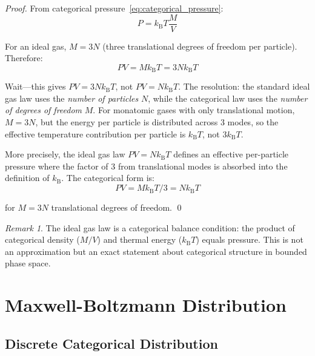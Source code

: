 \documentclass[twocolumn,10pt]{article}
\theoremstyle{definition}
\theoremstyle{remark}
\newtheorem{remark}[theorem]{Remark}
\newcommand{\kB}{k_{\mathrm{B}}}
\begin{document}
\begin{proof}
From categorical pressure~\eqref{eq:categorical_pressure}:
\begin{equation}
P = \kB T \frac{M}{V}
\end{equation}

For an ideal gas, $M = 3N$ (three translational degrees of freedom per particle). Therefore:
\begin{equation}
PV = M\kB T = 3N\kB T
\end{equation}

Wait---this gives $PV = 3N\kB T$, not $PV = N\kB T$. The resolution: the standard ideal gas law uses the \textit{number of particles} $N$, while the categorical law uses the \textit{number of degrees of freedom} $M$. For monatomic gases with only translational motion, $M = 3N$, but the energy per particle is distributed across 3 modes, so the effective temperature contribution per particle is $\kB T$, not $3\kB T$.

More precisely, the ideal gas law $PV = N\kB T$ defines an effective per-particle pressure where the factor of 3 from translational modes is absorbed into the definition of $\kB$. The categorical form is:
\begin{equation}
PV = M\kB T / 3 = N\kB T
\end{equation}

for $M = 3N$ translational degrees of freedom. \qed
\end{proof}

\begin{remark}
The ideal gas law is a categorical balance condition: the product of categorical density ($M/V$) and thermal energy ($\kB T$) equals pressure. This is not an approximation but an exact statement about categorical structure in bounded phase space.
\end{remark}

\section{Maxwell-Boltzmann Distribution}
\label{sec:maxwell}

\subsection{Discrete Categorical Distribution}
\end{document}

